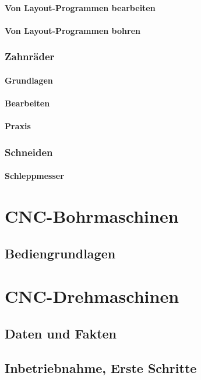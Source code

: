 \documentclass[14pt,a4paper]{book}
\begin{document}
			\subsubsection{Von Layout-Programmen bearbeiten} 
			\subsubsection{Von Layout-Programmen bohren} 
		\subsection{Zahnräder} 
			\subsubsection{Grundlagen} 
			\subsubsection{Bearbeiten} 
			\subsubsection{Praxis} 			
		\subsection{Schneiden} 
			\subsubsection{Schleppmesser} 
		 
\chapter{CNC-Bohrmaschinen} 
	\section{Bediengrundlagen}

\chapter{CNC-Drehmaschinen}
	\section{Daten und Fakten} 
	\section{Inbetriebnahme, Erste Schritte} 
\end{document}
